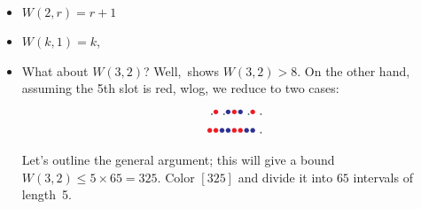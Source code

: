 \begin{example}
\begin{itemize}
	\item $W(2,r) = r+1$ 
	\item $W(k,1) = k$,
	\item What about $W(3,2)$? Well, \rdot\rdot\bdot\bdot\rdot\rdot\bdot\bdot \,shows $W(3,2) > 8$.  On the other hand, assuming the 5th slot is red, wlog, we reduce to two cases:
	\begin{align*}	
	\vartextvisiblespace \rdotm \vartextvisiblespace \bdotm \rdotm \bdotm \vartextvisiblespace \rdotm \vartextvisiblespace\\
	\rdotm\rdotm\bdotm\bdotm\rdotm\rdotm\bdotm\bdotm\vartextvisiblespace
	\end{align*}

	Let's outline the general argument; this will give a bound $W(3,2) \leq 5 \times 65 = 325$. Color $[325]$ and divide it into $65$ intervals of length~5.
\newcommand{\vdwdots}{\rdot\bdot\bdot\rdot\rdot}
\newcommand{\firstpic}{\begin{tikzpicture}[node distance = .5cm]
	\node[draw] (n1) at (0,0) {1\,2\,3\,4\,5};
	\node[left = 1cm of n1]{a)};
	\node[draw,right= of n1] (n2)  {6\,7\,8\,9\,10};

	\node[right= .25cm of n2] (n7)  {$\dotsm$};
	\node[draw,right= .25cm of n7] (n10)  {361\,362\,363\,364\,365};
	\end{tikzpicture}}
	\newcommand{\secondpic}{\begin{tikzpicture}[node distance = .5cm]
	\node[draw] (n1) at (0,0) {\phantom{\vdwdots}};
	\node[left = 1cm of n1]{b)};

	\node[draw,label=above:$I$,right=of n1] (n2) {\vdwdots};
	\node[right= .25cm of n2] (n3)  {$\dotsm$};
	\node[draw,right=.25cm of n3,label=above:$I+5d$] (n4)  {\vdwdots};
	\node[right= .25cm of n4] (n5)  {$\dotsm$};
	\node[draw,right= .25cm of n5] (n6)  {\phantom{\vdwdots}};
	\node[draw,right= of n6] (n6p5)  {\phantom{\vdwdots}};
	\node[right= .25cm of n6p5] (n7)  {$\dotsm$};
	\node[draw,right= .25cm of n7] (n10)  {\phantom{\vdwdots}};
\draw [
    thick,
    decoration={
        brace,
        mirror,
        raise=0.5cm
    },
    decorate] (n1.west) --  (n6.east) node [pos=0.5,anchor=north,yshift=-0.55cm] {$33$ intervals};
	\end{tikzpicture}}


\end{itemize}
\end{example}
